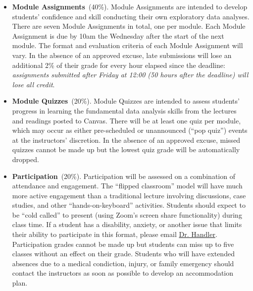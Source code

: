 \documentclass[10pt]{memoir}
\makeatletter
\def\instructorAlastname{Handler}
\def\instructorAemail{abe.handler@colorado.edu}
\makeatother
\begin{document}
\begin{itemize}%
    
    \item \textbf{Module Assignments}~(40\%). Module Assignments are intended to develop students' confidence and skill conducting their own exploratory data analyses. There are seven Module Assignments in total, one per module. Each Module Assignment is due by 10am the Wednesday after the start of the next module. The format and evaluation criteria of each Module Assignment will vary. In the absence of an approved excuse, late submissions will lose an additional 2\% of their grade for every hour elapsed since the deadline: \textit{assignments submitted after Friday at 12:00 (50 hours after the deadline) will lose all credit}.
    
    \item \textbf{Module Quizzes}~(20\%). Module Quizzes are intended to assess students' progress in learning the fundamental data analysis skills from the lectures and readings posted to Canvas. There will be at least one quiz per module, which may occur as either pre-scheduled or unannounced (``pop quiz'') events at the instructors' discretion. In the absence of an approved excuse, missed quizzes cannot be made up but the lowest quiz grade will be automatically dropped.
    
    \item \textbf{Participation}~(20\%). Participation will be assessed on a combination of attendance and engagement. The ``flipped classroom'' model will have much more active engagement than a traditional lecture involving discussions, case studies, and other ``hands-on-keyboard'' activities. Students should expect to be ``cold called'' to present (using Zoom's screen share functionality) during class time. If a student has a disability, anxiety, or another issue that limits their ability to participate in this format, please email \href{mailto:\instructorAemail}{Dr. \instructorAlastname}. Participation grades cannot be made up but students can miss up to five classes without an effect on their grade. Students who will have extended absences due to a medical condiction, injury, or family emergency should contact the instructors as soon as possible to develop an accommodation plan.
    
    

\end{itemize}
\end{document}
